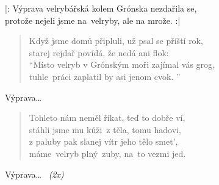 \begin{song}{}
\begin{refren}
   |: Výprava velrybářská kolem Grónska nezdařila se, \\
      protože nejeli jsme na~velryby, ale na mrože. :|
\end{refren}
\begin{verse}
   Když jsme domů připluli, už psal se příští rok, \\
   starej rejdař povídá, že nedá ani flok: \\
   \enquote{Místo velryb v Grónským moři zajímal vás grog, \\
   tuhle~práci zaplatil by asi jenom cvok. }
\end{verse}
\begin{refren}
   Výprava\ldots
\end{refren}
\begin{verse}
   Tohleto nám neměl říkat, teď to dobře ví, \\
   stáhli jsme mu kůži~z těla, tomu hadovi, \\
   z paluby pak slanej vítr jeho tělo smet',  \\
   máme~velryb plný~zuby, na~to vezmi jed.
\end{verse}
\begin{refren}
   Výprava\ldots~ \textit{(2x)}
\end{refren}
\end{song}
\pagebreak

